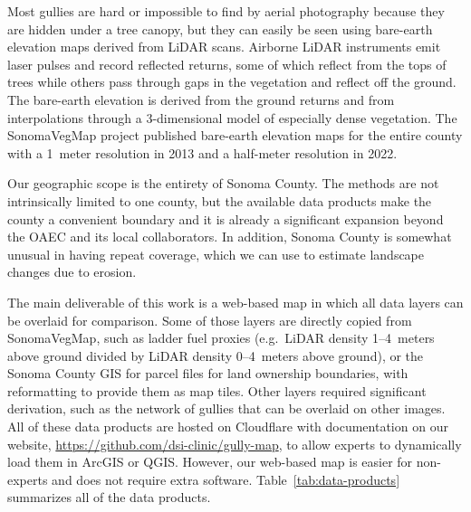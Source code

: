 Most gullies are hard or impossible to find by aerial photography because they are hidden under a tree canopy, but they can easily be seen using bare-earth elevation maps derived from LiDAR scans. Airborne LiDAR instruments emit laser pulses and record reflected returns, some of which reflect from the tops of trees while others pass through gaps in the vegetation and reflect off the ground. The bare-earth elevation is derived from the ground returns and from interpolations through a 3-dimensional model of especially dense vegetation. The SonomaVegMap project published bare-earth elevation maps for the entire county with a 1~meter resolution in 2013 and a half-meter resolution in 2022.

Our geographic scope is the entirety of Sonoma County. The methods are not intrinsically limited to one county, but the available data products make the county a convenient boundary and it is already a significant expansion beyond the OAEC and its local collaborators. In addition, Sonoma County is somewhat unusual in having repeat coverage, which we can use to estimate landscape changes due to erosion.

The main deliverable of this work is a web-based map in which all data layers can be overlaid for comparison. Some of those layers are directly copied from SonomaVegMap, such as ladder fuel proxies (e.g.\ LiDAR density 1--4~meters above ground divided by LiDAR density 0--4~meters above ground), or the Sonoma County GIS for parcel files for land ownership boundaries, with reformatting to provide them as map tiles. Other layers required significant derivation, such as the network of gullies that can be overlaid on other images. All of these data products are hosted on Cloudflare with documentation on our website, {\small \url{https://github.com/dsi-clinic/gully-map}}, to allow experts to dynamically load them in ArcGIS or QGIS. However, our web-based map is easier for non-experts and does not require extra software. Table~\ref{tab:data-products} summarizes all of the data products.

